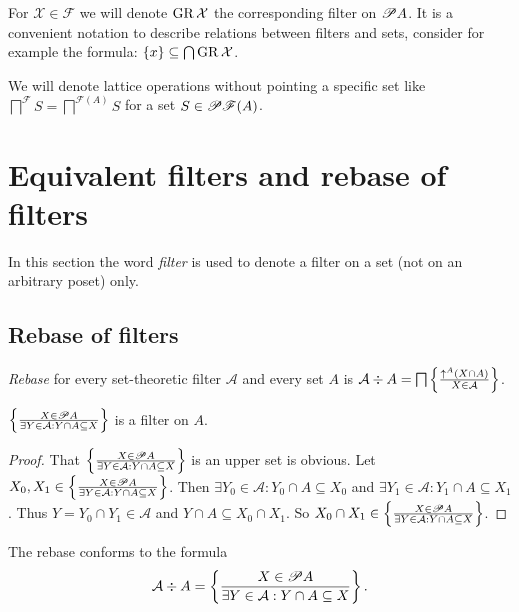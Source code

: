 For $\mathcal{X}\in\mathscr{F}$ we will denote $\operatorname{GR}\mathcal{X}$
the corresponding filter on $\mathscr{P} A$. It is a convenient notation
to describe relations between filters and sets, consider for example
the formula: $\{x\}\subseteq\bigcap\operatorname{GR}\mathcal{X}$.

We will denote lattice operations without pointing a specific set
like $\bigsqcap^{\mathscr{F}}S=\bigsqcap^{\mathscr{F}(A)}S$ for a
set $S\in\mathscr{P}\mathscr{F}(A)$.

\section{Equivalent filters and rebase of filters}

In this section the word \emph{filter} is used to denote a filter
on a set (not on an arbitrary poset) only.

\subsection{Rebase of filters}

\begin{defn}
\emph{Rebase} for every set-theoretic filter $\mathcal{A}$
and every set $A$ is
  $\mathcal{A} \div A = \bigsqcap \left\{ \frac{ \uparrow^A  (X \cap A) }{ X \in \mathcal{A} }\right\}$.
\end{defn}

\begin{lem}
$\left\{ \frac{X\in\mathscr{P} A}{\exists Y\in\mathcal{A}:Y\cap A\subseteq X}\right\}$ is a filter on $A$.
\end{lem}

\begin{proof}
That $\left\{ \frac{X\in\mathscr{P} A}{\exists Y\in\mathcal{A}:Y\cap A\subseteq X}\right\}$ is an upper set is obvious. Let $X_0,X_1\in\left\{ \frac{X\in\mathscr{P} A}{\exists Y\in\mathcal{A}:Y\cap A\subseteq X}\right\}$.
Then $\exists Y_0\in\mathcal{A}:Y_0\cap A\subseteq X_0$ and $\exists Y_1\in\mathcal{A}:Y_1\cap A\subseteq X_1$.
Thus $Y=Y_0\cap Y_1\in\mathcal{A}$ and $Y\cap A\subseteq X_0\cap X_1$. So $X_0\cap X_1\in\left\{ \frac{X\in\mathscr{P} A}{\exists Y\in\mathcal{A}:Y\cap A\subseteq X}\right\}$.
\end{proof}

\begin{prop}
The rebase conforms to the formula
\[
\mathcal{A}\div A=\left\{ \frac{X\in\mathscr{P} A}{\exists Y\in\mathcal{A}:Y\cap A\subseteq X}\right\}.
\]
\end{prop}

